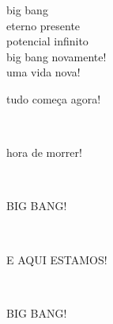 big bang\\
eterno presente\\
potencial infinito\\
big bang novamente!\\
uma vida nova!\\
\begin{large}tudo começa agora!\end{large}\\
\begin{large}hora de morrer!\end{large}\\
\begin{large}BIG BANG!\end{large}\\
\begin{large}E AQUI ESTAMOS!\end{large}\\
\begin{Large}BIG BANG!\end{Large}
